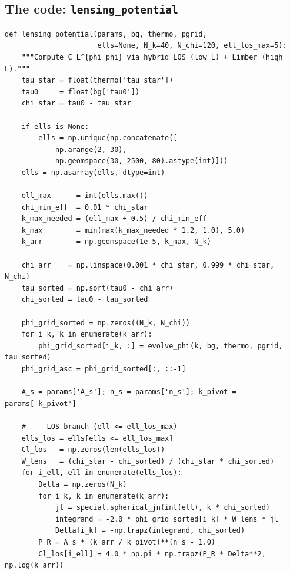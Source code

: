 \subsection{The code: \texttt{lensing\_potential}}

\begin{codebox}
\begin{lstlisting}[style=python]
def lensing_potential(params, bg, thermo, pgrid,
                      ells=None, N_k=40, N_chi=120, ell_los_max=5):
    """Compute C_L^{phi phi} via hybrid LOS (low L) + Limber (high L)."""
    tau_star = float(thermo['tau_star'])
    tau0     = float(bg['tau0'])
    chi_star = tau0 - tau_star

    if ells is None:
        ells = np.unique(np.concatenate([
            np.arange(2, 30),
            np.geomspace(30, 2500, 80).astype(int)]))
    ells = np.asarray(ells, dtype=int)

    ell_max      = int(ells.max())
    chi_min_eff  = 0.01 * chi_star
    k_max_needed = (ell_max + 0.5) / chi_min_eff
    k_max        = min(max(k_max_needed * 1.2, 1.0), 5.0)
    k_arr        = np.geomspace(1e-5, k_max, N_k)

    chi_arr    = np.linspace(0.001 * chi_star, 0.999 * chi_star, N_chi)
    tau_sorted = np.sort(tau0 - chi_arr)
    chi_sorted = tau0 - tau_sorted

    phi_grid_sorted = np.zeros((N_k, N_chi))
    for i_k, k in enumerate(k_arr):
        phi_grid_sorted[i_k, :] = evolve_phi(k, bg, thermo, pgrid, tau_sorted)
    phi_grid_asc = phi_grid_sorted[:, ::-1]

    A_s = params['A_s']; n_s = params['n_s']; k_pivot = params['k_pivot']

    # --- LOS branch (ell <= ell_los_max) ---
    ells_los = ells[ells <= ell_los_max]
    Cl_los   = np.zeros(len(ells_los))
    W_lens   = (chi_star - chi_sorted) / (chi_star * chi_sorted)
    for i_ell, ell in enumerate(ells_los):
        Delta = np.zeros(N_k)
        for i_k, k in enumerate(k_arr):
            jl = special.spherical_jn(int(ell), k * chi_sorted)
            integrand = -2.0 * phi_grid_sorted[i_k] * W_lens * jl
            Delta[i_k] = -np.trapz(integrand, chi_sorted)
        P_R = A_s * (k_arr / k_pivot)**(n_s - 1.0)
        Cl_los[i_ell] = 4.0 * np.pi * np.trapz(P_R * Delta**2, np.log(k_arr))


\end{lstlisting}
\end{codebox}
